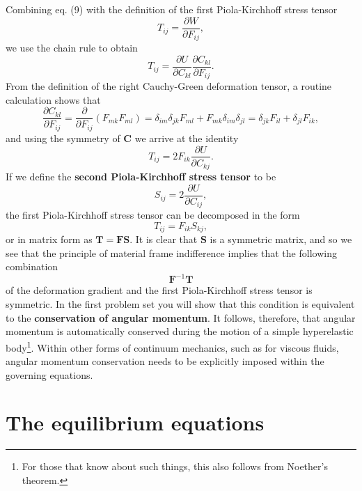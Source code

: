 \documentclass [a4paper,12pt]{paper}
\begin{document}
Combining eq. (9) with the definition of the first Piola-Kirchhoff stress tensor
\begin{equation}
T_{ij} = \frac{\partial W}{\partial F_{ij}},
\end{equation}
we use the chain rule to obtain
\begin{equation}
T_{ij} = \frac{\partial U}{\partial C_{kl}}\frac{\partial C_{kl}}{\partial F_{ij}}.
\end{equation}
From the definition of the right Cauchy-Green deformation tensor, a routine calculation shows that
\begin{equation}
\frac{\partial C_{kl}}{\partial F_{ij}} = \frac{\partial}{\partial F_{ij}}(F_{mk}F_{ml}) = \delta_{im}\delta_{jk}F_{ml} + F_{mk}\delta_{im}\delta_{jl} = \delta_{jk}F_{il} + \delta_{jl}F_{ik},
\end{equation}
and using the symmetry of $\mathbf{C}$ we arrive at the identity
\begin{equation}
T_{ij} = 2F_{ik}\frac{\partial U}{\partial C_{kj}}.
\end{equation}
If we define the \textbf{second Piola-Kirchhoff stress tensor} to be
\begin{equation}
S_{ij} = 2\frac{\partial U}{\partial C_{ij}},
\end{equation}
the first Piola-Kirchhoff stress tensor can be decomposed in the form
\begin{equation}
T_{ij} = F_{ik}S_{kj},
\end{equation}
or in matrix form as $\mathbf{T} = \mathbf{F}\mathbf{S}$. It is clear that $\mathbf{S}$ is a symmetric matrix,
 and so we see that the principle of material frame indifference implies that the following combination
\begin{equation}
\mathbf{F}^{-1}\mathbf{T}
\end{equation}
of the deformation gradient and the first Piola-Kirchhoff stress tensor is symmetric. In the first 
problem set you will show that this condition is equivalent to the \textbf{conservation of angular momentum}. It follows, therefore, 
that angular momentum is automatically conserved during the motion of a simple hyperelastic body\footnote{For those
 that know about such things, this also follows from Noether's theorem.}. Within other forms of
 continuum mechanics, such as for viscous fluids, angular momentum conservation needs to be explicitly imposed within the governing equations.

\section*{The equilibrium equations}
\end{document}
